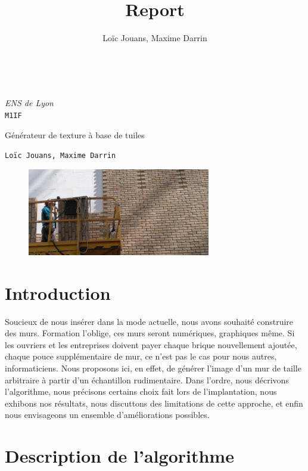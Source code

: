 \documentclass{article}
\title{Report}
\author{Loïc Jouans, Maxime Darrin}
\begin{document}
 
\noindent
\emph{ENS de Lyon}\\\texttt{M1IF}

\vspace*{\fill}
\begin{center}
    {\Huge {Générateur de texture à base de tuiles}}\\
    \vspace*{1.5cm}
    \date\\
    \vspace*{1cm}
    \Large \texttt{Loïc Jouans, Maxime Darrin}
\end{center}

\thispagestyle{empty}
\vspace*{\fill}



\newpage



\begin{figure}
    \centering
    \includegraphics[width=8cm]{pic/Intro.png}
\end{figure}

\section{Introduction}
Soucieux de nous insérer dans la mode actuelle, nous avons souhaité construire des murs. Formation l'oblige, ces murs seront numériques, graphiques même. Si les ouvriers et les entreprises doivent payer chaque brique nouvellement ajoutée, chaque pouce supplémentaire de mur, ce n'est pas le cas pour nous autres, informaticiens. Nous proposons ici, en effet, de générer l'image d'un mur de taille arbitraire à partir d'un échantillon rudimentaire. 
Dans l'ordre, nous décrivons l'algorithme, nous précisons certains choix fait lors de l'implantation, nous exhibons nos résultats, nous discuttons des limitations de cette approche, et enfin nous envisageons un ensemble d'améliorations possibles.

\section{Description de l'algorithme}
\end{document}
